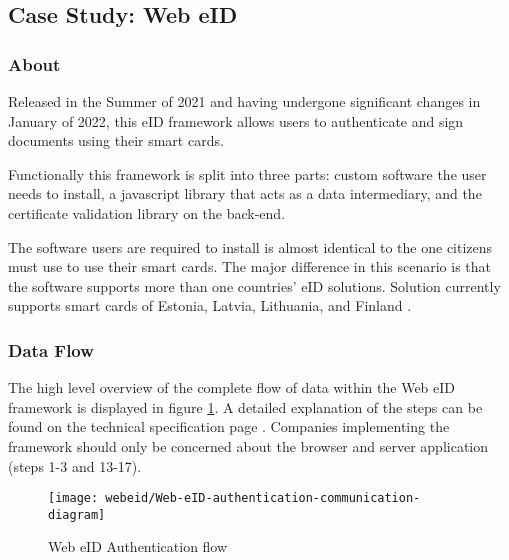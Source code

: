 \subsection{Case Study: Web eID}

\subsubsection{About}

Released in the Summer of 2021 \cite{ria-webeid} and having undergone significant changes in January of 2022, this eID framework allows users to authenticate and sign documents using their smart cards.

Functionally this framework is split into three parts: custom software the user needs to install, a javascript library that acts as a data intermediary, and the certificate validation library on the back-end.

The software users are required to install is almost identical to the one citizens must use to use their smart cards. The major difference in this scenario is that the software supports more than one countries' eID solutions. Solution currently supports smart cards of Estonia, Latvia, Lithuania, and Finland \cite{ria-webeid}.


\subsubsection{Data Flow}

The high level overview of the complete flow of data within the Web eID framework is displayed in figure \ref{fig:web-eid-authentication}. A detailed explanation of the steps can be found on the technical specification page \cite{ria-webeid-systemarchitecture}. Companies implementing the framework should only be concerned about the browser and server application (steps 1-3 and 13-17).

\begin{figure}
    \centering
    \texttt{[image: webeid/Web-eID-authentication-communication-diagram]}
    \caption{Web eID Authentication flow \cite{ria-webeid-systemarchitecture}}
    \label{fig:web-eid-authentication}
\end{figure}




